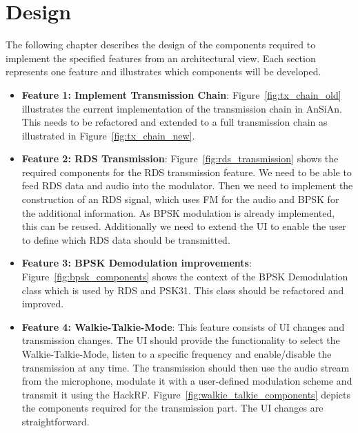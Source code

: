 \chapter{Design}
The following chapter describes the design of the components required to implement the specified features from an architectural view. Each section represents one feature and illustrates which components will be developed. 

\begin{itemize}
	\item \textbf{Feature 1: Implement Transmission Chain}: Figure~\ref{fig:tx_chain_old} illustrates the current implementation of the transmission chain in \ac{AnSiAn}. This needs to be refactored and extended to a full transmission chain as illustrated in Figure~\ref{fig:tx_chain_new}.
	
	\item \textbf{Feature 2: RDS Transmission}: Figure~\ref{fig:rds_transmission} shows the required components for the RDS transmission feature. We need to be able to feed RDS data and audio into the modulator. Then we need to implement the construction of an RDS signal, which uses \ac{FM} for the audio and \ac{BPSK} for the additional information. As BPSK modulation is already implemented, this can be reused. Additionally we need to extend the UI to enable the user to define which RDS data should be transmitted. 
	
	\item \textbf{Feature 3: BPSK Demodulation improvements}: Figure~\ref{fig:bpsk_components} shows the context of the \ac{BPSK} Demodulation class which is used by \ac{RDS} and PSK31. This class should be refactored and improved.
	
	\item \textbf{Feature 4: Walkie-Talkie-Mode}: This feature consists of UI changes and transmission changes. The UI should provide the functionality to select the Walkie-Talkie-Mode, listen to a specific frequency and enable/disable the transmission at any time. The transmission should then use the audio stream from the microphone, modulate it with a user-defined modulation scheme and transmit it using the HackRF. Figure~\ref{fig:walkie_talkie_components} depicts the components required for the transmission part. The UI changes are straightforward.
\end{itemize}


